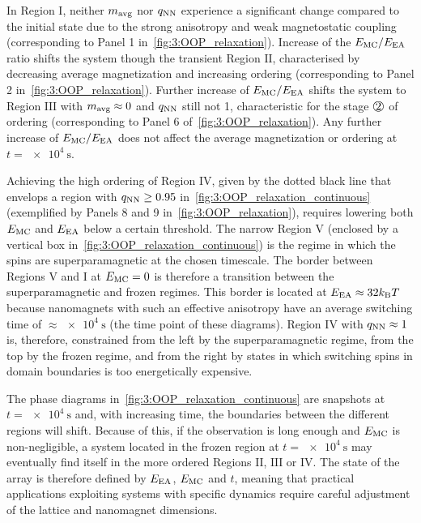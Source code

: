 In Region $\mathrm{I}$, neither $m_\mathrm{avg}$ nor $q_\mathrm{NN}$ experience a significant change compared to the initial state due to the strong anisotropy and weak magnetostatic coupling (corresponding to Panel 1 in~\cref{fig:3:OOP_relaxation}).
Increase of the $E_\mathrm{MC}/E_\mathrm{EA}$ ratio shifts the system though the transient Region $\mathrm{II}$, characterised by decreasing average magnetization and increasing ordering (corresponding to Panel 2 in~\cref{fig:3:OOP_relaxation}).
Further increase of $E_\mathrm{MC}/E_\mathrm{EA}$ shifts the system to Region $\mathrm{III}$ with $m_\mathrm{avg} \approx 0$ and $q_\mathrm{NN}$ still not 1, characteristic for the stage $\circled{2}$ of ordering (corresponding to Panel 6 of~\cref{fig:3:OOP_relaxation}).
Any further increase of $E_\mathrm{MC}/E_\mathrm{EA}$ does not affect the average magnetization or ordering at $t = \SI{e4}{\second}$. \par
Achieving the high ordering of Region $\mathrm{IV}$, given by the dotted black line that envelops a region with $q_\mathrm{NN} \geq 0.95$ in~\cref{fig:3:OOP_relaxation_continuous} (exemplified by Panels 8 and 9 in~\cref{fig:3:OOP_relaxation}), requires lowering both $E_\mathrm{MC}$ and $E_\mathrm{EA}$ below a certain threshold.
The narrow Region $\mathrm{V}$ (enclosed by a vertical box in~\cref{fig:3:OOP_relaxation_continuous}) is the regime in which the spins are superparamagnetic at the chosen timescale.
The border between Regions $\mathrm{V}$ and $\mathrm{I}$ at $E_\mathrm{MC} = 0$ is therefore a transition between the superparamagnetic and frozen regimes.
This border is located at $\EEA \approx 32 \kBT$ because nanomagnets with such an effective anisotropy have an average switching time of $\approx \SI{e4}{\second}$ (the time point of these diagrams).
Region $\mathrm{IV}$ with $q_\mathrm{NN} \approx 1$ is, therefore, constrained from the left by the superparamagnetic regime, from the top by the frozen regime, and from the right by states in which switching spins in domain boundaries is too energetically expensive. \par
The phase diagrams in~\cref{fig:3:OOP_relaxation_continuous} are snapshots at $t = \SI{e4}{\second}$ and, with increasing time, the boundaries between the different regions will shift.
Because of this, if the observation is long enough and $E_\mathrm{MC}$ is non-negligible, a system located in the frozen region at $t = \SI{e4}{\second}$ may eventually find itself in the more ordered Regions $\mathrm{II}$, $\mathrm{III}$ or $\mathrm{IV}$. %
The state of the array is therefore defined by $E_\mathrm{EA}$, $E_\mathrm{MC}$ and $t$, meaning that practical applications exploiting systems with specific dynamics require careful adjustment of the lattice and nanomagnet dimensions. 

